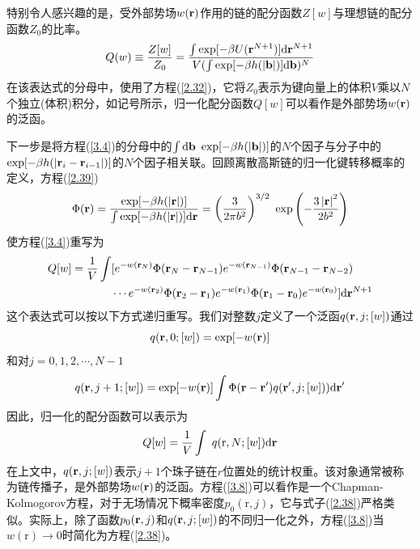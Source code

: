 特别令人感兴趣的是，受外部势场$w(\mathbf{r})$作用的链的配分函数$Z[w]$与理想链的配分函数$Z_0$的比率。
\begin{equation}\label{3.4}
Q(w)\equiv\frac{Z[w]}{Z_0}=\frac{\int\exp[-\beta U(\mathbf{r}^{N+1})]\mathrm{d}\mathbf{r}^{N+1}}{V(\int\exp[-\beta h(\left|\mathbf{b}\right|)]\mathrm{d}\mathbf{b})^N}
\end{equation}
在该表达式的分母中，使用了方程(\ref{2.32})，它将$Z_0$表示为键向量上的体积$V$乘以$N$个独立(体积)积分，如记号所示，归一化配分函数$Q[w]$可以看作是外部势场$w(\mathbf{r})$的泛函。

下一步是将方程(\ref{3.4})的分母中的$\int\mathrm{d}\mathbf{b}~\exp[-\beta h(\left|\mathbf{b}\right|)]$的$N$个因子与分子中的$\exp[-\beta h(\left|\mathbf{r}_i-\mathbf{r}_{i-1}\right|)]$的$N$个因子相关联。回顾离散高斯链的归一化键转移概率的定义，方程(\ref{2.39})
\begin{equation}\label{3.5}
\Phi(\mathbf{r})=\frac{\exp[-\beta h(\left|\mathbf{r}\right|)]}{\int\exp[-\beta h(\left|\mathbf{r}\right|)]\mathrm{d}\mathbf{r}}=\left(\frac{3}{2\pi b^2}\right)^{3/2}~\exp\left(-\frac{3\left|\mathbf{r}\right|^2}{2b^2}\right)
\end{equation}
使方程(\ref{3.4})重写为
\begin{equation}\label{3.6}
\begin{aligned}
Q[w]=\frac{1}{V}\int&[e^{-w(\mathbf{r}_N)}\Phi(\mathbf{r}_N-\mathbf{r}_{N-1})e^{-w(\mathbf{r}_{N-1})}\Phi(\mathbf{r}_{N-1}-\mathbf{r}_{N-2})\\
&\cdots e^{-w(\mathbf{r}_2)}\Phi(\mathbf{r}_2-\mathbf{r}_1)e^{-w(\mathbf{r}_1)}\Phi(\mathbf{r}_1-\mathbf{r}_0)e^{-w(\mathbf{r}_0)}]\mathrm{d}\mathbf{r}^{N+1}
\end{aligned}
\end{equation}
这个表达式可以按以下方式递归重写。我们对整数$j$定义了一个泛函$q(\mathbf{r},j;[w])$通过
\begin{equation}\label{3.7}
q(\mathbf{r},0;[w])=\exp[-w(\mathbf{r})]
\end{equation}
和对$j=0,1,2,\cdots,N-1$
\begin{equation}\label{3.8}
q(\mathbf{r},j+1;[w])=\exp[-w(\mathbf{r})]\int\Phi(\mathbf{r}-\mathbf{r}')q(\mathbf{r}',j;[w]))\mathrm{d}\mathbf{r}'
\end{equation}
因此，归一化的配分函数可以表示为
\begin{equation}\label{3.9}
Q[w]=\frac{1}{V}\int~q(\mathrm{r},N;[w])\mathrm{d}\mathbf{r}
\end{equation}
在上文中，$q(\mathbf{r},j;[w])$表示$j+1$个珠子链在$r$位置处的统计权重。该对象通常被称为链传播子，是外部势场$w(\mathbf{r})$的泛函。方程(\ref{3.8})可以看作是一个Chapman-Kolmogorov方程，对于无场情况下概率密度$p_0(\mathrm{r},j)$，它与式子(\ref{2.38})严格类似。实际上，除了函数$p_0(\mathbf{r},j)$和$q(\mathbf{r},j;[w])$的不同归一化之外，方程(\ref{3.8})当$w(\mathrm{r})\rightarrow 0$时简化为方程(\ref{2.38})。

